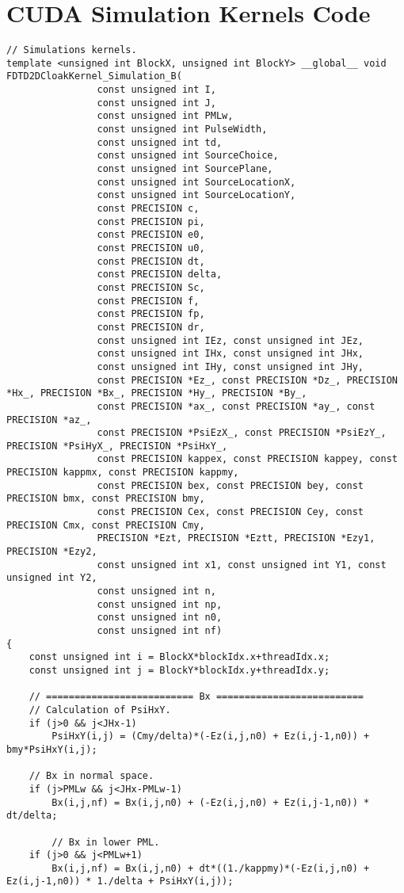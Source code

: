 \section{CUDA Simulation Kernels Code}
\label{App:CUDA-Cloak-Simulation-Kernels}
\begin{lstlisting}
// Simulations kernels.
template <unsigned int BlockX, unsigned int BlockY> __global__ void FDTD2DCloakKernel_Simulation_B(
				const unsigned int I,
				const unsigned int J,
				const unsigned int PMLw,
				const unsigned int PulseWidth,
				const unsigned int td,
				const unsigned int SourceChoice,
				const unsigned int SourcePlane,
				const unsigned int SourceLocationX,
				const unsigned int SourceLocationY,
				const PRECISION c,
				const PRECISION pi,
				const PRECISION e0,
				const PRECISION u0,
				const PRECISION dt,
				const PRECISION delta,
				const PRECISION Sc,
				const PRECISION f,
				const PRECISION fp,
				const PRECISION dr,
				const unsigned int IEz, const unsigned int JEz,
				const unsigned int IHx, const unsigned int JHx,
				const unsigned int IHy, const unsigned int JHy,
				const PRECISION *Ez_, const PRECISION *Dz_, PRECISION *Hx_, PRECISION *Bx_, PRECISION *Hy_, PRECISION *By_,
				const PRECISION *ax_, const PRECISION *ay_, const PRECISION *az_,
				const PRECISION *PsiEzX_, const PRECISION *PsiEzY_, PRECISION *PsiHyX_, PRECISION *PsiHxY_,
				const PRECISION kappex, const PRECISION kappey, const PRECISION kappmx, const PRECISION kappmy,
				const PRECISION bex, const PRECISION bey, const PRECISION bmx, const PRECISION bmy,
				const PRECISION Cex, const PRECISION Cey, const PRECISION Cmx, const PRECISION Cmy,
				PRECISION *Ezt, PRECISION *Eztt, PRECISION *Ezy1, PRECISION *Ezy2,
				const unsigned int x1, const unsigned int Y1, const unsigned int Y2,
				const unsigned int n,
				const unsigned int np,
				const unsigned int n0,
				const unsigned int nf)
{
	const unsigned int i = BlockX*blockIdx.x+threadIdx.x;
	const unsigned int j = BlockY*blockIdx.y+threadIdx.y;

	// ========================== Bx ==========================
	// Calculation of PsiHxY.
	if (j>0 && j<JHx-1)
		PsiHxY(i,j) = (Cmy/delta)*(-Ez(i,j,n0) + Ez(i,j-1,n0)) + bmy*PsiHxY(i,j);

	// Bx in normal space.
	if (j>PMLw && j<JHx-PMLw-1)
		Bx(i,j,nf) = Bx(i,j,n0) + (-Ez(i,j,n0) + Ez(i,j-1,n0)) * dt/delta;

		// Bx in lower PML.
	if (j>0 && j<PMLw+1)
		Bx(i,j,nf) = Bx(i,j,n0) + dt*((1./kappmy)*(-Ez(i,j,n0) + Ez(i,j-1,n0)) * 1./delta + PsiHxY(i,j));


\end{lstlisting}
